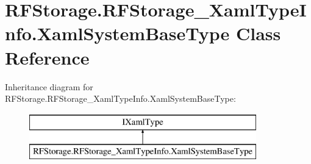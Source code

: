 \hypertarget{class_r_f_storage_1_1_r_f_storage___xaml_type_info_1_1_xaml_system_base_type}{}\section{R\+F\+Storage.\+R\+F\+Storage\+\_\+\+Xaml\+Type\+Info.\+Xaml\+System\+Base\+Type Class Reference}
\label{class_r_f_storage_1_1_r_f_storage___xaml_type_info_1_1_xaml_system_base_type}
Inheritance diagram for R\+F\+Storage.\+R\+F\+Storage\+\_\+\+Xaml\+Type\+Info.\+Xaml\+System\+Base\+Type\+:\begin{figure}[H]
\begin{center}
\leavevmode
\includegraphics[height=2.000000cm]{class_r_f_storage_1_1_r_f_storage___xaml_type_info_1_1_xaml_system_base_type}
\end{center}
\end{figure}
